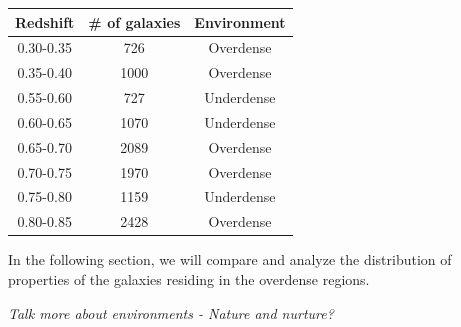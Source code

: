 \documentclass[twocolumn,useAMS,usenatbib]{mn2e}
\begin{document}
\begin{tabular}{c|c|c|}
 \hline
 Redshift & \# of galaxies & Environment \\
 \hline
 0.30-0.35 & 726 & Overdense \\
 0.35-0.40 & 1000 & Overdense \\
 0.55-0.60 & 727 & Underdense \\
 0.60-0.65 & 1070 & Underdense \\
 0.65-0.70 & 2089 & Overdense \\
 0.70-0.75 & 1970 & Overdense \\
 0.75-0.80 & 1159 & Underdense \\
 0.80-0.85 & 2428 & Overdense \\
 \hline
\end{tabular}

In the following section, we will compare and analyze the distribution of properties of the galaxies residing in the overdense regions.

\emph{Talk more about environments - Nature and nurture?}

\end{document}
